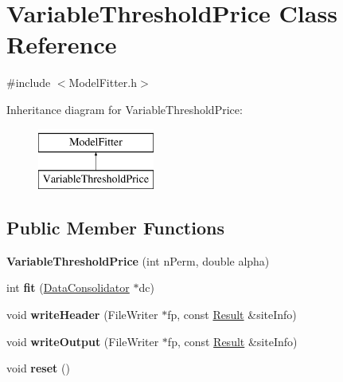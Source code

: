 \hypertarget{classVariableThresholdPrice}{\section{Variable\-Threshold\-Price Class Reference}
\label{classVariableThresholdPrice}
}


{\ttfamily \#include $<$Model\-Fitter.\-h$>$}

Inheritance diagram for Variable\-Threshold\-Price\-:\begin{figure}[H]
\begin{center}
\leavevmode
\includegraphics[height=2.000000cm]{classVariableThresholdPrice}
\end{center}
\end{figure}
\subsection*{Public Member Functions}
\begin{DoxyCompactItemize}
\item 
\hypertarget{classVariableThresholdPrice_a9fe39d3156a406c0bf1df62d0418b673}{{\bfseries Variable\-Threshold\-Price} (int n\-Perm, double alpha)}\label{classVariableThresholdPrice_a9fe39d3156a406c0bf1df62d0418b673}

\item 
\hypertarget{classVariableThresholdPrice_a6b78a3ba3b3b33f924d95f7a4631fd7b}{int {\bfseries fit} (\hyperlink{classDataConsolidator}{Data\-Consolidator} $\ast$dc)}\label{classVariableThresholdPrice_a6b78a3ba3b3b33f924d95f7a4631fd7b}

\item 
\hypertarget{classVariableThresholdPrice_ae2dd45c3b0d387bee374192ec4b54e66}{void {\bfseries write\-Header} (File\-Writer $\ast$fp, const \hyperlink{classResult}{Result} \&site\-Info)}\label{classVariableThresholdPrice_ae2dd45c3b0d387bee374192ec4b54e66}

\item 
\hypertarget{classVariableThresholdPrice_abebd5bb0e6a1f8a71849c9302f1f7c39}{void {\bfseries write\-Output} (File\-Writer $\ast$fp, const \hyperlink{classResult}{Result} \&site\-Info)}\label{classVariableThresholdPrice_abebd5bb0e6a1f8a71849c9302f1f7c39}

\item 
\hypertarget{classVariableThresholdPrice_abc9db0a117d7cc255db900a1da8cfc97}{void {\bfseries reset} ()}\label{classVariableThresholdPrice_abc9db0a117d7cc255db900a1da8cfc97}

\end{DoxyCompactItemize}

